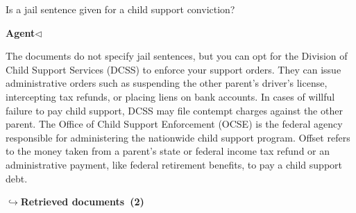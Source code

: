 \documentclass[a4paper,11pt]{article}
\begin{document}
\begin{userbubble}
  Is a jail sentence given for a child support conviction?
\end{userbubble}
\noindent\hfill{\small\textcolor{agentcolor}{\textbf{Agent\enspace$\triangleleft$}}}
\begin{agentbubble}
The documents do not specify jail sentences, but you can opt for the Division of Child Support Services (DCSS) to enforce your support orders. They can issue administrative orders such as suspending the other parent's driver's license, intercepting tax refunds, or placing liens on bank accounts. In cases of willful failure to pay child support, DCSS may file contempt charges against the other parent. The Office of Child Support Enforcement (OCSE) is the federal agency responsible for administering the nationwide child support program. Offset refers to the money taken from a parent's state or federal income tax refund or an administrative payment, like federal retirement benefits, to pay a child support debt.
\end{agentbubble}
\noindent\hfill{\footnotesize\textcolor{doccolor}{\textbf{$\hookrightarrow$\enspace Retrieved documents~(2)}}}
\end{document}

